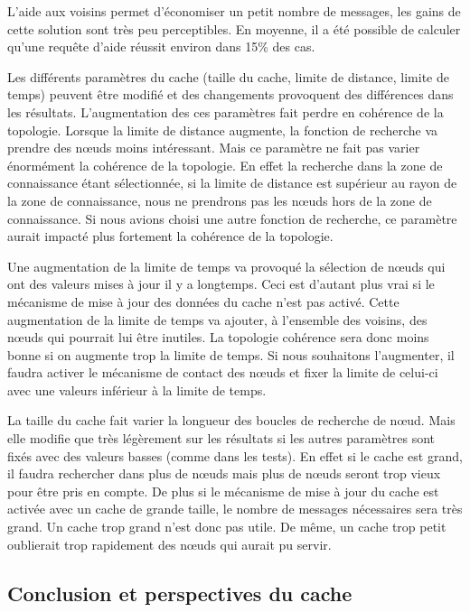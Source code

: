 \par L'aide aux voisins permet d'économiser un petit nombre de messages, les gains de cette solution sont très peu perceptibles. En moyenne, il a été possible de calculer qu'une requête d'aide réussit environ dans 15\% des cas.

\par Les différents paramètres du cache (taille du cache, limite de distance, limite de temps) peuvent être modifié et des changements provoquent des différences dans les résultats. L'augmentation des ces paramètres fait perdre en cohérence de la topologie. Lorsque la limite de distance augmente, la fonction de recherche va prendre des nœuds moins intéressant. Mais ce paramètre ne fait pas varier énormément la cohérence de la topologie. En effet la recherche dans la zone de connaissance étant sélectionnée, si la limite de distance est supérieur au rayon de la zone de connaissance, nous ne prendrons pas les nœuds hors de la zone de connaissance. Si nous avions choisi une autre fonction de recherche, ce paramètre aurait impacté plus fortement la cohérence de la topologie.
\par Une augmentation de la limite de temps va provoqué la sélection de nœuds qui ont des valeurs mises à jour il y a longtemps. Ceci est d'autant plus vrai si le mécanisme de mise à jour des données du cache n'est pas activé. Cette augmentation de la limite de temps va ajouter, à l'ensemble des voisins, des nœuds qui pourrait lui être inutiles. La topologie cohérence sera donc moins bonne si on augmente trop la limite de temps. Si nous souhaitons l'augmenter, il faudra activer le mécanisme de contact des nœuds et fixer la limite de celui-ci avec une valeurs inférieur à la limite de temps.
\par La taille du cache fait varier la longueur des boucles de recherche de nœud. Mais elle modifie que très légèrement sur les résultats si les autres paramètres sont fixés avec des valeurs basses (comme dans les tests). En effet si le cache est grand, il faudra rechercher dans plus de nœuds mais plus de nœuds seront trop vieux pour être pris en compte. De plus si le mécanisme de mise à jour du cache est activée avec un cache de grande taille, le nombre de messages nécessaires sera très grand. Un cache trop grand n'est donc pas utile. De même, un cache trop petit oublierait trop rapidement des nœuds qui aurait pu servir.  

\subsection{Conclusion et perspectives du cache} 

